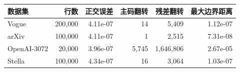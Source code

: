 \begin{tabular}{@{}lrrrrr@{}}
\toprule
数据集 & 行数 & 正交误差 & 主码翻转 & 残差翻转 & 最大边界距离 \\
\midrule
Vogue & 200,000 & 4.11e-07 & 14 & 5,409 & 1.12e-07 \\
arXiv & 100,000 & 4.11e-07 & 1 & 2,515 & 7.31e-08 \\
OpenAI-3072 & 20,000 & 3.96e-07 & 5,745 & 1,646,806 & 2.67e-05 \\
Stella & 100,000 & 4.34e-07 & 16 & 3,064 & 1.03e-07 \\
\bottomrule
\end{tabular}
